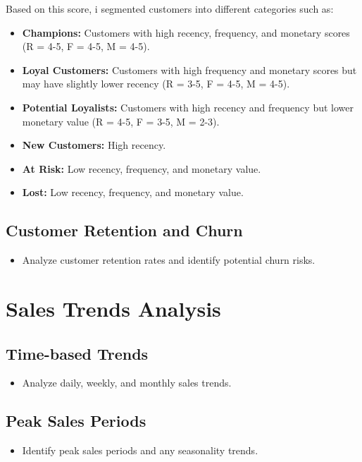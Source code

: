 \documentclass{article}
\renewcommand{\answer}[1]{
  \begin{tcolorbox}[
    breakable,
    enhanced,
    colback=backgroundColor,
    colframe=primaryColor,
    coltitle=white,
    title=Answer
  ]
    #1
  \end{tcolorbox}
}
\begin{document}
\answer{
    Based on this score, i segmented customers into different categories such as:
    \begin{itemize}
        \item \textbf{Champions:} Customers with high recency, frequency, and monetary scores (R = 4-5, F = 4-5, M = 4-5).{

        }
        \item \textbf{Loyal Customers:}  Customers with high frequency and monetary scores but may have slightly lower recency (R = 3-5, F = 4-5, M = 4-5).
        \item \textbf{Potential Loyalists:} Customers with high recency and frequency but lower monetary value (R = 4-5, F = 3-5, M = 2-3).
        \item \textbf{New Customers:} High recency.
        \item \textbf{At Risk:} Low recency, frequency, and monetary value.
        \item \textbf{Lost:} Low recency, frequency, and monetary value.
    \end{itemize}
}

    
    
    \subsection{Customer Retention and Churn}
    \begin{itemize}
        \item Analyze customer retention rates and identify potential churn risks.
    \end{itemize}

\section{Sales Trends Analysis}
    \subsection{Time-based Trends}
    \begin{itemize}
        \item Analyze daily, weekly, and monthly sales trends.
    \end{itemize}
    
    \subsection{Peak Sales Periods}
    \begin{itemize}
        \item Identify peak sales periods and any seasonality trends.
    \end{itemize}
    
\end{document}
